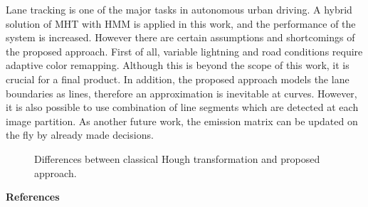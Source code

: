 \documentclass{ws-procs9x6}
\begin{document}
\noindent Lane tracking is one of the major tasks in autonomous urban driving. A hybrid solution of MHT with HMM is applied in this work, and the performance of the system is increased. However there are certain assumptions and shortcomings of the proposed approach. First of all, variable lightning and road conditions require adaptive color remapping. Although this is beyond the scope of this work, it is crucial for a final product. In addition, the proposed approach models the lane boundaries as lines, therefore an approximation is inevitable at curves. However, it is also possible to use combination of line segments which are detected at each image partition. As another future work, the emission matrix can be updated on the fly by already made decisions.

\begin{figure}
\begin{center}
\end{center}
\caption{Differences between classical Hough transformation and proposed approach.}
\label{aba:fig4}
\end{figure}

\noindent \textbf{\eject References}
\end{document}
